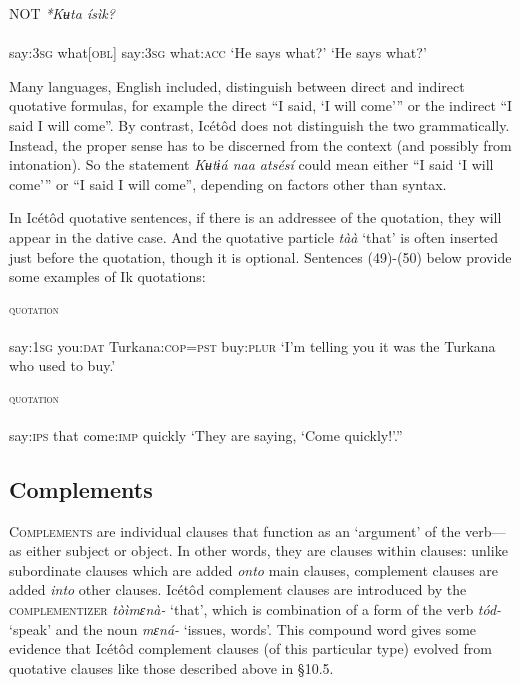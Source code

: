 \ea\label{ex:}
    NOT  \textit{*Kʉta   ísìk?} \\
    \\
say:\textsc{3sg}   what[\textsc{obl}]    say:\textsc{3sg}   what:\textsc{acc}
\glt ‘He says what?’      ‘He says what?’ 
\z


Many languages, English included, distinguish between direct and indirect quotative formulas, for example the direct “I said, ‘I will come’” or the indirect “I said I will come”. By contrast, Icétôd does not distinguish the two grammatically. Instead, the proper sense has to be discerned from the context (and possibly from intonation). So the statement \textit{Kʉtɨá naa atsésí} could mean either “I said ‘I will come’” or “I said I will come”, depending on factors other than syntax. 

In Icétôd quotative sentences, if there is an addressee of the quotation, they will appear in the dative case. And the quotative particle \textit{tàà} ‘that’ is often inserted just before the quotation, though it is optional. Sentences (49)-(50) below provide some examples of Ik quotations:



\ea\label{ex:}
\textsc{\textsubscript{quotation}} \\
    \\
say:\textsc{1sg}   you:\textsc{dat} Turkana:\textsc{cop=pst} buy:\textsc{plur}
\glt ‘I’m telling you it was the Turkana who used to buy.’ 
\z




\ea\label{ex:}
\textsc{\textsubscript{quotation}}  \\
    \\
say:\textsc{ips}  that   come:\textsc{imp}   quickly
\glt ‘They are saying, ‘Come quickly!’.” 
\z






\subsection{Complements}


\textsc{Complements} are individual clauses that function as an ‘argument’\textsc{} of the verb—as either subject or object. In other words, they are clauses within clauses: unlike subordinate clauses which are added \textit{onto} main clauses, complement clauses are added \textit{into} other clauses. Icétôd complement clauses are introduced by the \textsc{complementizer} \textit{tòìmɛnà-} ‘that’, which is combination of a form of the verb \textit{tód-} ‘speak’ and the noun \textit{mɛná-} ‘issues, words’. This compound word gives some evidence that Icétôd complement clauses (of this particular type) evolved from quotative clauses like those described above in §10.5.

